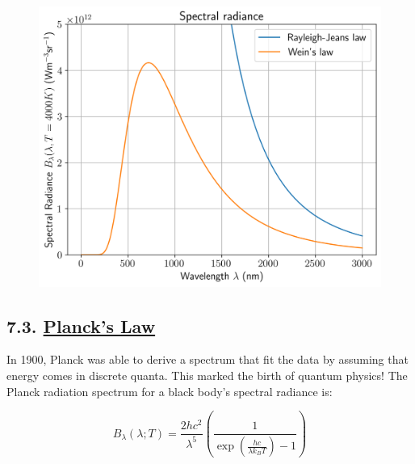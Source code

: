 \documentclass[
  letterpaper,
  DIV=11,
  numbers=noendperiod]{scrartcl}
\begin{document}
\begin{figure}[H]

{\centering \includegraphics{SP1.1_-_Stellar_Properties_files/figure-pdf/cell-20-output-1.png}

}

\end{figure}

\hypertarget{plancks-law}{%
\subsection{\texorpdfstring{7.3. \protect\hyperlink{toc0_}{Planck's
Law}}{7.3. Planck's Law}}\label{plancks-law}}

In 1900, Planck was able to derive a spectrum that fit the data by
assuming that energy comes in discrete quanta. This marked the birth of
quantum physics! The Planck radiation spectrum for a black body's
spectral radiance is:

\begin{equation}
B_\lambda(\lambda; T) = \frac{2 hc^2}{\lambda^5}\left(\frac{1}{\exp\left(\frac{hc}{\lambda k_B T}\right) -1} \right)
\end{equation}
\end{document}
